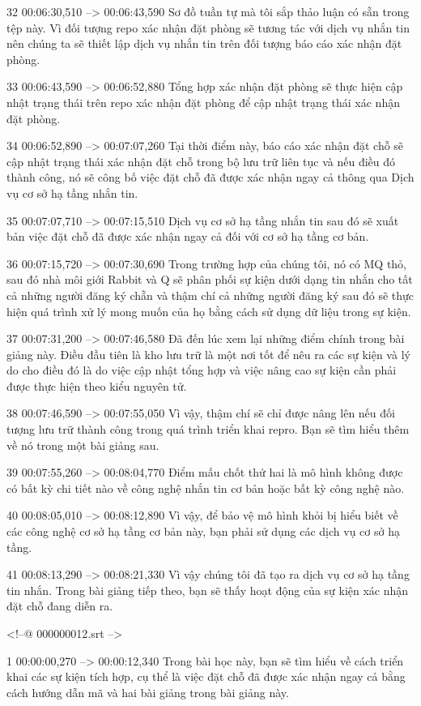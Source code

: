 32
00:06:30,510 --> 00:06:43,590
Sơ đồ tuần tự mà tôi sắp thảo luận có sẵn trong tệp này.  Vì đối tượng repo xác nhận đặt phòng sẽ tương tác với dịch vụ nhắn tin nên chúng ta sẽ thiết lập dịch vụ nhắn tin trên đối tượng báo cáo xác nhận đặt phòng.

33
00:06:43,590 --> 00:06:52,880
Tổng hợp xác nhận đặt phòng sẽ thực hiện cập nhật trạng thái trên repo xác nhận đặt phòng để cập nhật trạng thái xác nhận đặt phòng.

34
00:06:52,890 --> 00:07:07,260
Tại thời điểm này, báo cáo xác nhận đặt chỗ sẽ cập nhật trạng thái xác nhận đặt chỗ trong bộ lưu trữ liên tục và nếu điều đó thành công, nó sẽ công bố việc đặt chỗ đã được xác nhận ngay cả thông qua Dịch vụ cơ sở hạ tầng nhắn tin.

35
00:07:07,710 --> 00:07:15,510
Dịch vụ cơ sở hạ tầng nhắn tin sau đó sẽ xuất bản việc đặt chỗ đã được xác nhận ngay cả đối với cơ sở hạ tầng cơ bản.

36
00:07:15,720 --> 00:07:30,690
Trong trường hợp của chúng tôi, nó có MQ thỏ, sau đó nhà môi giới Rabbit và Q sẽ phân phối sự kiện dưới dạng tin nhắn cho tất cả những người đăng ký chẵn và thậm chí cả những người đăng ký sau đó sẽ thực hiện quá trình xử lý mong muốn của họ bằng cách sử dụng dữ liệu trong sự kiện.

37
00:07:31,200 --> 00:07:46,580
Đã đến lúc xem lại những điểm chính trong bài giảng này.  Điều đầu tiên là kho lưu trữ là một nơi tốt để nêu ra các sự kiện và lý do cho điều đó là do việc cập nhật tổng hợp và việc nâng cao sự kiện cần phải được thực hiện theo kiểu nguyên tử.

38
00:07:46,590 --> 00:07:55,050
Vì vậy, thậm chí sẽ chỉ được nâng lên nếu đối tượng lưu trữ thành công trong quá trình triển khai repro.  Bạn sẽ tìm hiểu thêm về nó trong một bài giảng sau.

39
00:07:55,260 --> 00:08:04,770
Điểm mấu chốt thứ hai là mô hình không được có bất kỳ chi tiết nào về công nghệ nhắn tin cơ bản hoặc bất kỳ công nghệ nào.

40
00:08:05,010 --> 00:08:12,890
Vì vậy, để bảo vệ mô hình khỏi bị hiểu biết về các công nghệ cơ sở hạ tầng cơ bản này, bạn phải sử dụng các dịch vụ cơ sở hạ tầng.

41
00:08:13,290 --> 00:08:21,330
Vì vậy chúng tôi đã tạo ra dịch vụ cơ sở hạ tầng tin nhắn.  Trong bài giảng tiếp theo, bạn sẽ thấy hoạt động của sự kiện xác nhận đặt chỗ đang diễn ra.

<!--@ 000000012.srt -->

1
00:00:00,270 --> 00:00:12,340
Trong bài học này, bạn sẽ tìm hiểu về cách triển khai các sự kiện tích hợp, cụ thể là việc đặt chỗ đã được xác nhận ngay cả bằng cách hướng dẫn mã và hai bài giảng trong bài giảng này.

